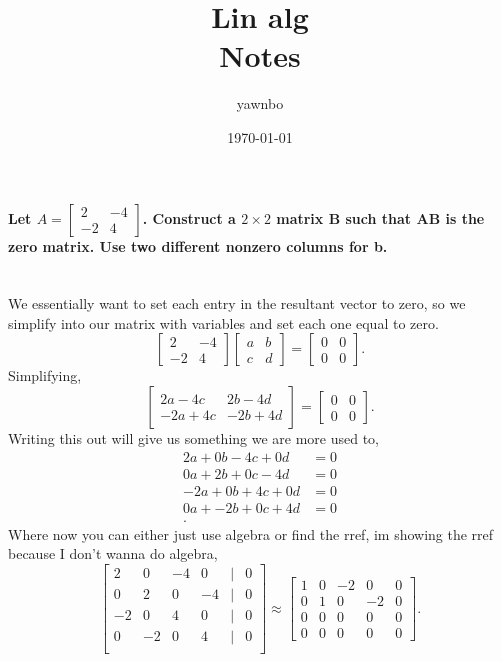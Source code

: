 \documentclass{report}
\title{\Huge{Lin alg}\\ Notes }
\author{\huge{yawnbo}}
\date{\today}
\begin{document}
\maketitle
\paragraph{Let $ A = \begin{bmatrix} 2 & -4 \\ -2 & 4 \end{bmatrix}  $. Construct a $ 2 \times 2 $ matrix B such that AB is the zero matrix. Use two different nonzero columns for b. \\ \\}
We essentially want to set each entry in the resultant vector to zero, so we simplify into our matrix with variables and set each one equal to zero. 
\[
	\begin{bmatrix} 2 & -4 \\ -2 & 4 \end{bmatrix} \begin{bmatrix} a & b \\ c & d \end{bmatrix} = \begin{bmatrix} 0 & 0 \\ 0 & 0 \end{bmatrix} 
.\] 
Simplifying,
\[
	\begin{bmatrix} 2a - 4c & 2b -4d \\ -2a + 4c & -2b +4d \end{bmatrix} = \begin{bmatrix} 0 & 0 \\ 0 & 0 \end{bmatrix}
.\] 
Writing this out will give us something we are more used to,
\begin{align*}
2a + 0b - 4c + 0d &= 0 \\
0a + 2b + 0c - 4d &= 0 \\
-2a + 0b + 4c + 0d &= 0 \\
0a + -2b + 0c + 4d &= 0 \\
.\end{align*}
Where now you can either just use algebra or find the rref, im showing the rref because I don't wanna do algebra,
\[
	\begin{bmatrix} 2 & 0 & -4 & 0 & \big| & 0 \\ 0 & 2 & 0 & -4 & \big| & 0 \\ -2 & 0 & 4 & 0 & \big| & 0 \\ 0 & -2 & 0 & 4 & \big| & 0 \\ \end{bmatrix} \approx \begin{bmatrix} 1 & 0 & -2 & 0 & 0 \\ 0 & 1 & 0 & -2 & 0 \\ 0 & 0 & 0 & 0 & 0 \\ 0 & 0 & 0 & 0 & 0 \end{bmatrix} 
.\] 
\end{document}
